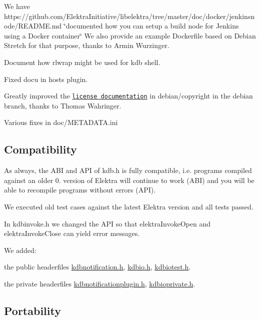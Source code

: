 \begin{DoxyItemize}
\item We have https\+://github.com/\+Elektra\+Initiative/libelektra/tree/master/doc/docker/jenkinsnode/\+R\+E\+A\+D\+M\+E.\+md \char`\"{}documented how you can setup a build node for Jenkins using a Docker container\char`\"{} We also provide an example Dockerfile based on Debian Stretch for that purpose, thanks to Armin Wurzinger.
\item Document how {\ttfamily rlwrap} might be used for {\ttfamily kdb shell}.
\item Fixed docu in {\ttfamily hosts} plugin.
\item Greatly improved the \href{https://git.libelektra.org/blob/debian/debian/copyright}{\tt license documentation} in {\ttfamily debian/copyright} in the {\ttfamily debian} branch, thanks to Thomas Wahringer.
\item Various fixes in doc/\+M\+E\+T\+A\+D\+A\+T\+A.\+ini
\end{DoxyItemize}

\subsection*{Compatibility}

As always, the A\+BI and A\+PI of kdb.\+h is fully compatible, i.\+e. programs compiled against an older 0. version of Elektra will continue to work (A\+BI) and you will be able to recompile programs without errors (A\+PI).

We executed old test cases against the latest Elektra version and all tests passed.

In {\ttfamily kdbinvoke.\+h} we changed the A\+PI so that {\ttfamily elektra\+Invoke\+Open} and {\ttfamily elektra\+Invoke\+Close} can yield error messages.

We added\+:


\begin{DoxyItemize}
\item the public headerfiles {\ttfamily \hyperlink{kdbnotification_8h}{kdbnotification.\+h}}, {\ttfamily \hyperlink{kdbio_8h}{kdbio.\+h}}, {\ttfamily \hyperlink{kdbiotest_8h}{kdbiotest.\+h}}.
\item the private headerfiles {\ttfamily \hyperlink{kdbnotificationplugin_8h}{kdbnotificationplugin.\+h}}, {\ttfamily \hyperlink{kdbioprivate_8h}{kdbioprivate.\+h}}.
\end{DoxyItemize}

\subsection*{Portability}


